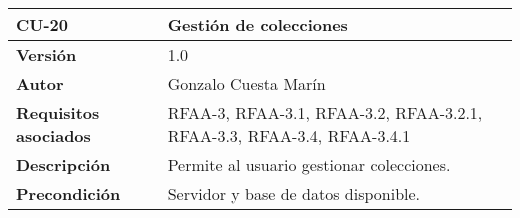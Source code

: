 \begin{longtable}[]{@{}ll@{}}
\toprule
\begin{minipage}[b]{0.18\columnwidth}\raggedright
\textbf{CU-20}\strut
\end{minipage} & \begin{minipage}[b]{0.76\columnwidth}\raggedright
\textbf{Gestión de colecciones}\strut
\end{minipage}\tabularnewline
\midrule
\endhead
\begin{minipage}[t]{0.18\columnwidth}\raggedright
\textbf{Versión}\strut
\end{minipage} & \begin{minipage}[t]{0.76\columnwidth}\raggedright
1.0\strut
\end{minipage}\tabularnewline
\begin{minipage}[t]{0.18\columnwidth}\raggedright
\textbf{Autor}\strut
\end{minipage} & \begin{minipage}[t]{0.76\columnwidth}\raggedright
Gonzalo Cuesta Marín\strut
\end{minipage}\tabularnewline
\begin{minipage}[t]{0.18\columnwidth}\raggedright
\textbf{Requisitos asociados}\strut
\end{minipage} & \begin{minipage}[t]{0.76\columnwidth}\raggedright
RFAA-3, RFAA-3.1, RFAA-3.2, RFAA-3.2.1, RFAA-3.3, RFAA-3.4,
RFAA-3.4.1\strut
\end{minipage}\tabularnewline
\begin{minipage}[t]{0.18\columnwidth}\raggedright
\textbf{Descripción}\strut
\end{minipage} & \begin{minipage}[t]{0.76\columnwidth}\raggedright
Permite al usuario gestionar colecciones.\strut
\end{minipage}\tabularnewline
\begin{minipage}[t]{0.18\columnwidth}\raggedright
\textbf{Precondición}\strut
\end{minipage} & \begin{minipage}[t]{0.76\columnwidth}\raggedright
Servidor y base de datos disponible.


\end{minipage}
\end{longtable}
